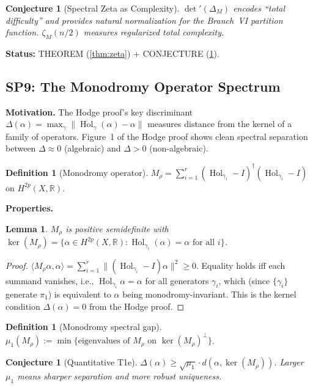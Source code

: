 \documentclass[11pt]{article}
\newtheorem{lemma}[theorem]{Lemma}
\newtheorem{conjecture}[theorem]{Conjecture}
\theoremstyle{definition}
\newtheorem{definition}[theorem]{Definition}
\theoremstyle{remark}
\newcommand{\Hol}{\operatorname{Hol}}
\begin{document}
\begin{conjecture}[Spectral Zeta as Complexity]\label{conj:zeta}
$\det'(\Delta_M)$ encodes ``total difficulty'' and provides natural normalization for the Branch~VI partition function. $\zeta_M(n/2)$ measures regularized total complexity.
\end{conjecture}

\textbf{Status:} THEOREM (\ref{thm:zeta}) + CONJECTURE (\ref{conj:zeta}).


\subsection{SP9: The Monodromy Operator Spectrum}

\textbf{Motivation.} The Hodge proof's key discriminant $\Delta(\alpha) = \max_\gamma \|\Hol_\gamma(\alpha) - \alpha\|$ measures distance from the kernel of a family of operators. Figure~1 of the Hodge proof shows clean spectral separation between $\Delta \approx 0$ (algebraic) and $\Delta > 0$ (non-algebraic).

\begin{definition}[Monodromy operator]\label{def:Mrho}
$M_\rho = \sum_{i=1}^r (\Hol_{\gamma_i} - I)^\dagger(\Hol_{\gamma_i} - I)$ on $H^{2p}(X, \mathbb{R})$.
\end{definition}

\textbf{Properties.}

\begin{lemma}\label{lem:Mrho_psd}
$M_\rho$ is positive semidefinite with $\ker(M_\rho) = \{\alpha \in H^{2p}(X, \mathbb{R}) : \Hol_{\gamma_i}(\alpha) = \alpha \text{ for all } i\}$.
\end{lemma}

\begin{proof}
$\langle M_\rho\alpha, \alpha\rangle = \sum_{i=1}^r \|(\Hol_{\gamma_i} - I)\alpha\|^2 \ge 0$. Equality holds iff each summand vanishes, i.e., $\Hol_{\gamma_i}\alpha = \alpha$ for all generators $\gamma_i$, which (since $\{\gamma_i\}$ generate $\pi_1$) is equivalent to $\alpha$ being monodromy-invariant. This is the kernel condition $\Delta(\alpha) = 0$ from the Hodge proof.
\end{proof}

\begin{definition}[Monodromy spectral gap]
$\mu_1(M_\rho) := \min\{\text{eigenvalues of } M_\rho \text{ on } \ker(M_\rho)^\perp\}$.
\end{definition}

\begin{conjecture}[Quantitative T1e]\label{conj:quantT1e}
$\Delta(\alpha) \ge \sqrt{\mu_1}\cdot d(\alpha, \ker(M_\rho))$. Larger $\mu_1$ means sharper separation and more robust uniqueness.
\end{conjecture}
\end{document}
